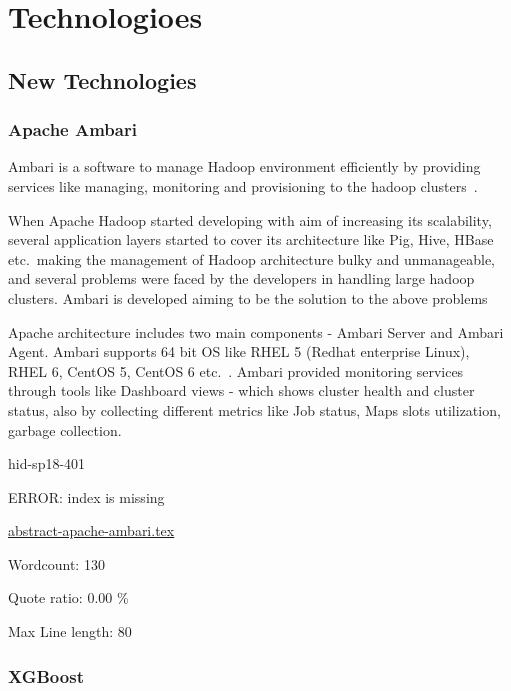 \part{Technologioes}
\chapter{New Technologies}
\section{Apache Ambari}  

Ambari is a software  to manage Hadoop environment
efficiently by providing services like managing, monitoring and provisioning to
the hadoop clusters~\cite{hid-sp18-401-wiki-Ambari}.

When Apache Hadoop started developing with aim of increasing its scalability,
several application layers started to cover its architecture like Pig, Hive,
HBase etc.\ making the management of Hadoop architecture bulky and unmanageable,
and several problems were faced by the developers in handling large hadoop
clusters. Ambari is developed aiming to be the solution to the above problems


Apache architecture includes two main components - Ambari Server and Ambari
Agent. Ambari supports 64 bit OS like RHEL 5 (Redhat enterprise Linux), RHEL 6,
CentOS 5, CentOS 6 etc.~\cite{hid-sp18-401-Ambari}. Ambari provided monitoring
services through tools like Dashboard views - which shows cluster health and
cluster status, also by collecting different metrics like Job status, Maps slots
utilization, garbage collection.



\begin{IU}

hid-sp18-401

ERROR: index is missing

\href{https://github.com/cloudmesh-community/hid-sp18-401/blob/master//technology/abstract-apache-ambari.tex}{abstract-apache-ambari.tex}

 

Wordcount: 130


Quote ratio: 0.00 \%
 
Max Line length: 80
\end{IU}

\section{XGBoost} 

